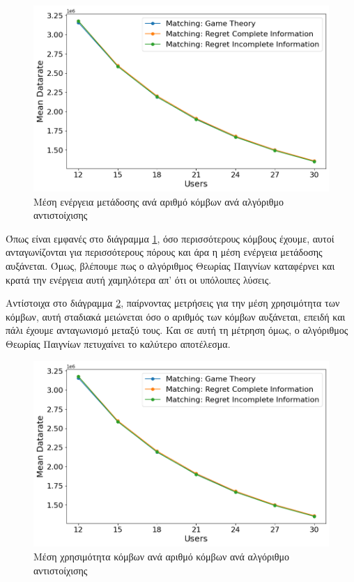 \begin{figure}[ht]
    \centering
    \includegraphics[width=\textwidth]{figures/chapter4/Mean_Datarate_vs_Users.png}
    \caption{Μέση ενέργεια μετάδοσης ανά αριθμό κόμβων ανά αλγόριθμο αντιστοίχισης}
    \label{fig8}
\end{figure}

Όπως είναι εμφανές στο διάγραμμα \ref{fig8}, όσο περισσότερους κόμβους έχουμε, αυτοί ανταγωνίζονται για περισσότερους πόρους και άρα η μέση ενέργεια μετάδοσης αυξάνεται. Όμως, βλέπουμε πως ο αλγόριθμος Θεωρίας Παιγνίων καταφέρνει και κρατά την ενέργεια αυτή χαμηλότερα απ' ότι οι υπόλοιπες λύσεις.

Αντίστοιχα στο διάγραμμα \ref{fig9}, παίρνοντας μετρήσεις για την μέση χρησιμότητα των κόμβων, αυτή σταδιακά μειώνεται όσο ο αριθμός των κόμβων αυξάνεται, επειδή και πάλι έχουμε ανταγωνισμό μεταξύ τους. Και σε αυτή τη μέτρηση όμως, ο αλγόριθμος Θεωρίας Παιγνίων πετυχαίνει το καλύτερο αποτέλεσμα.

\newpage

\begin{figure}[H]
    \centering
    \includegraphics[width=\textwidth]{figures/chapter4/Mean_Datarate_vs_Users.png}
    \caption{Μέση χρησιμότητα κόμβων ανά αριθμό κόμβων ανά αλγόριθμο αντιστοίχισης}
    \label{fig9}
\end{figure}

